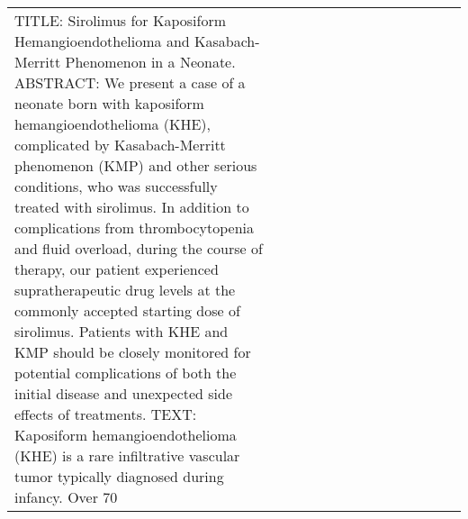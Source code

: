 \begin{longtable}{llllllllllllll}
TITLE: Sirolimus for Kaposiform Hemangioendothelioma and Kasabach-Merritt Phenomenon in a Neonate. ABSTRACT: We present a case of a neonate born with kaposiform hemangioendothelioma (KHE), complicated by Kasabach-Merritt phenomenon (KMP) and other serious conditions, who was successfully treated with sirolimus. In addition to complications from thrombocytopenia and fluid overload, during the course of therapy, our patient experienced supratherapeutic drug levels at the commonly accepted starting dose of sirolimus. Patients with KHE and KMP should be closely monitored for potential complications of both the initial disease and unexpected side effects of treatments. TEXT: Kaposiform hemangioendothelioma (KHE) is a rare infiltrative vascular tumor typically diagnosed during infancy. Over 70%

\end{longtable}
